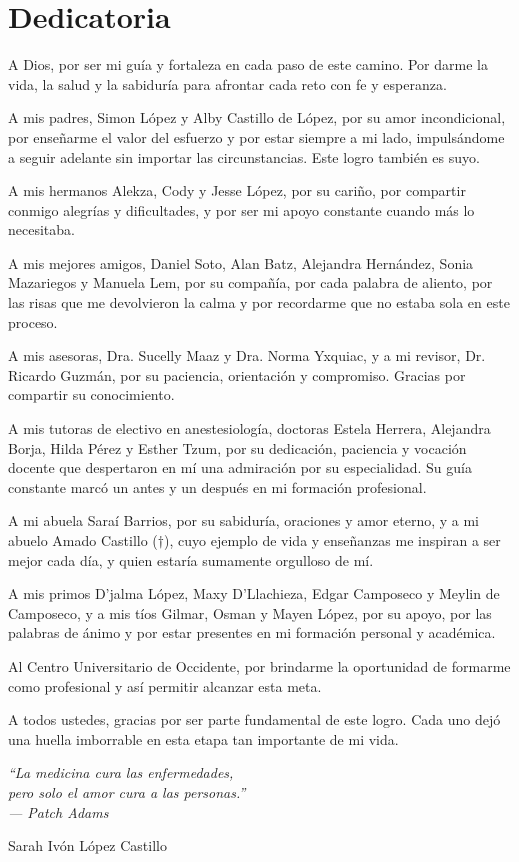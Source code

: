 \chapter*{Dedicatoria}

A Dios, por ser mi guía y fortaleza en cada paso de este camino. Por darme la 
vida, la salud y la sabiduría para afrontar cada reto con fe y esperanza.

A mis padres, Simon López y Alby Castillo de López, por su amor incondicional, 
por enseñarme el valor del esfuerzo y por estar siempre a mi lado, 
impulsándome a seguir adelante sin importar las circunstancias. Este logro 
también es suyo.

A mis hermanos Alekza, Cody y Jesse López, por su cariño, por compartir 
conmigo alegrías y dificultades, y por ser mi apoyo constante cuando más lo 
necesitaba.

A mis mejores amigos, Daniel Soto, Alan Batz, Alejandra Hernández, Sonia 
Mazariegos y Manuela Lem, por su compañía, por cada palabra de aliento, por 
las risas que me devolvieron la calma y por recordarme que no estaba sola en 
este proceso.

A mis asesoras, Dra. Sucelly Maaz y Dra. Norma Yxquiac, y a mi revisor, Dr. 
Ricardo Guzmán, por su paciencia, orientación y compromiso. Gracias por 
compartir su conocimiento.

A mis tutoras de electivo en anestesiología, doctoras Estela Herrera, 
Alejandra Borja, Hilda Pérez y Esther Tzum, por su dedicación, paciencia y 
vocación docente que despertaron en mí una admiración por su especialidad. Su 
guía constante marcó un antes y un después en mi formación profesional.

A mi abuela Saraí Barrios, por su sabiduría, oraciones y amor eterno, y a mi 
abuelo Amado Castillo ($\dagger$), cuyo ejemplo de vida y enseñanzas me 
inspiran a ser mejor cada día, y quien estaría sumamente orgulloso de mí.

A mis primos D'jalma López, Maxy D'Llachieza, Edgar Camposeco y Meylin de 
Camposeco, y a mis tíos Gilmar, Osman y Mayen López, por su apoyo, por las 
palabras de ánimo y por estar presentes en mi formación personal y académica.

Al Centro Universitario de Occidente, por brindarme la oportunidad de 
formarme como profesional y así permitir alcanzar esta meta.

A todos ustedes, gracias por ser parte fundamental de este logro. Cada uno 
dejó una huella imborrable en esta etapa tan importante de mi vida.

\vspace{0.5cm}

\begin{center}
\textit{``La medicina cura las enfermedades, \\
pero solo el amor cura a las personas.''} \\
\textit{--- Patch Adams}
\end{center}

\begin{flushright}
Sarah Ivón López Castillo
\end{flushright}
